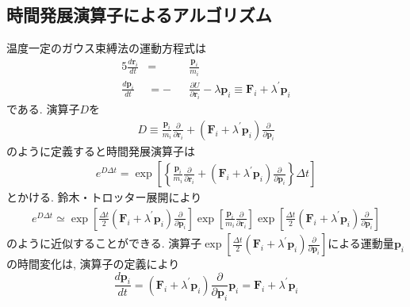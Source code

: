 \subsection{時間発展演算子によるアルゴリズム}
温度一定のガウス束縛法の運動方程式は
\begin{alignat}{5}
    \frac{d \bm{r}_{i}}{dt}
    &=&&
    \frac{\bm{p}_{i}}{m_{i}}
    \\
    \frac{d \bm{p}_{i}}{dt}
    &=-&&
    \frac{\partial U}{\partial \bm{r}_{i}}
    -
    \lambda \bm{p}_{i}
    \equiv
    \bm{F}_{i} + \lambda^{\prime} \bm{p}_{i}
\end{alignat}
である. 演算子$D$を
\begin{eqnarray}
    D \equiv
    \frac{\bm{p}_{i}}{m_{i}} \frac{\partial}{\partial \bm{r}_{i}}
    +
    (\bm{F}_{i} + \lambda^{\prime} \bm{p}_{i})
    \frac{\partial}{\partial \bm{p}_{i}}
\end{eqnarray}
のように定義すると時間発展演算子は
\begin{align}
    e^{D \Delta t}
    =
    \exp
    \left[
        \left\{
            \frac{\bm{p}_{i}}{m_{i}}
            \frac{\partial}{\partial \bm{r}_{i}}
            +
            \left(
                \bm{F}_{i} + \lambda^{\prime} \bm{p}_{i}
            \right)
            \frac{\partial}{\partial \bm{p}_{i}}
        \right\}
        \Delta t
    \right]
\end{align}
とかける. 鈴木・トロッター展開により
\begin{align}
    e^{D \Delta t}
    \simeq
    \exp
    \left[
        \frac{\Delta t}{2}
        \left(
            \bm{F}_{i} + \lambda^{\prime} \bm{p}_{i}
        \right)
        \frac{\partial}{\partial \bm{p}_{i}}
    \right]
    \exp
    \left[
        \frac{\bm{p}_{i}}{m_{i}}
        \frac{\partial}{\partial \bm{r}_{i}}
    \right]
    \exp
    \left[
        \frac{\Delta t}{2}
        \left(
            \bm{F}_{i} + \lambda^{\prime} \bm{p}_{i}
        \right)
        \frac{\partial}{\partial \bm{p}_{i}}
    \right]
\end{align}
のように近似することができる.
演算子$\exp\left[\frac{\Delta t}{2}\left(\bm{F}_{i} + \lambda^{\prime} \bm{p}_{i}\right)\frac{\partial}{\partial \bm{p}_{i}}\right]$による運動量$\bm{p}_{i}$の時間変化は, 演算子の定義により
\begin{equation}
    \frac{d \bm{p}_{i}}{dt}
    =
    \left(
        \bm{F}_{i} + \lambda^{\prime} \bm{p}_{i}
    \right)
    \frac{\partial}{\partial \bm{p}_{i}} \bm{p}_{i}
    =
    \bm{F}_{i} + \lambda^{\prime} \bm{p}_{i}
\end{equation}
